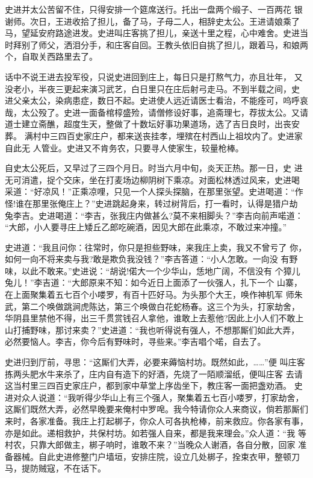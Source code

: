 史进并太公苦留不住，只得安排一个筵席送行。托出一盘两个缎子、一百两花
银谢师。次日，王进收拾了担儿，备了马，子母二人，相辞史太公。王进请娘乘了
马，望延安府路途进发。史进叫庄客挑了担儿，亲送十里之程，心中难舍。史进当
时拜别了师父，洒泪分手，和庄客自回。王教头依旧自挑了担儿，跟着马，和娘两
个，自取关西路里去了。

话中不说王进去投军役，只说史进回到庄上，每日只是打熬气力，亦且壮年，
又没老小，半夜三更起来演习武艺，白日里只在庄后射弓走马。不到半载之间，史
进父亲太公，染病患症，数日不起。史进使人远近请医士看治，不能痊可，呜呼哀
哉，太公殁了。史进一面备棺椁盛殓，请僧修设好事，追斋理七，荐拔太公。又请
道士建立斋醮，超度生天，整做了十数坛好事功果道场，选了吉日良时，出丧安葬。
满村中三四百史家庄户，都来送丧挂孝，埋殡在村西山上祖坟内了。史进家自此无
人管业。史进又不肯务农，只要寻人使家生，较量枪棒。

自史太公死后，又早过了三四个月日。时当六月中旬，炎天正热。那一日，史
进无可消遣，捉个交床，坐在打麦场边柳阴树下乘凉。对面松林透过风来，史进喝
采道：“好凉风！”正乘凉哩，只见一个人探头探脑，在那里张望。史进喝道：“作
怪!谁在那里张俺庄上？”史进跳起身来，转过树背后，打一看时，认得是猎户劫
兔李吉。史进喝道：“李吉，张我庄内做甚么?莫不来相脚头？”李吉向前声喏道：
“大郎，小人要寻庄上矮丘乙郎吃碗酒，因见大郎在此乘凉，不敢过来冲撞。”

史进道：“我且问你：往常时，你只是担些野味，来我庄上卖，我又不曾亏了
你，如何一向不将来卖与我?敢是欺负我没钱？”李吉答道：“小人怎敢。一向没
有野味，以此不敢来。”史进说：“胡说!偌大一个少华山，恁地广阔，不信没有
个獐儿兔儿！”李吉道：“大郎原来不知：如今近日上面添了一伙强人，扎下一个
山寨，在上面聚集着五七百个小喽罗，有百十匹好马。为头那个大王，唤作神机军
师朱武，第二个唤做跳涧虎陈达，第三个唤做白花蛇杨春。这三个为头，打家劫舍，
华阴县里禁他不得，出三千贯赏钱召人拿他，谁敢上去惹他?因此上小人们不敢上
山打捕野味，那讨来卖？”史进道：“我也听得说有强人，不想那厮们如此大弄，
必然要恼人。李吉，你今后有野味时，寻些来。”李吉唱个喏，自去了。

史进归到厅前，寻思：“这厮们大弄，必要来薅恼村坊。既然如此，……”便
叫庄客拣两头肥水牛来杀了，庄内自有造下的好酒，先烧了一陌顺溜纸，便叫庄客
去请这当村里三四百史家庄户，都到家中草堂上序齿坐下，教庄客一面把盏劝酒。
史进对众人说道：“我听得少华山上有三个强人，聚集着五七百小喽罗，打家劫舍，
这厮们既然大弄，必然早晚要来俺村中罗唣。我今特请你众人来商议，倘若那厮们
来时，各家准备。我庄上打起梆子，你众人可各执枪棒，前来救应。你各家有事，
亦是如此。递相救护，共保村坊。如若强人自来，都是我来理会。”众人道：“我
等村农，只靠大郎做主，梆子响时，谁敢不来？”当晚众人谢酒，各自分散，回家
准备器械。自此史进修整门户墙垣，安排庄院，设立几处梆子，拴束衣甲，整顿刀
马，提防贼寇，不在话下。

